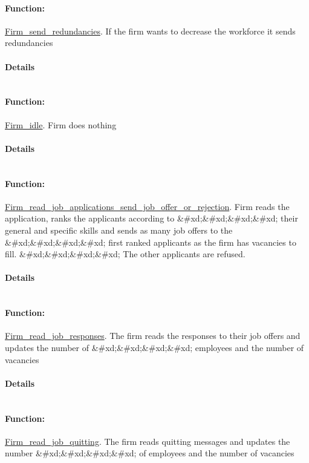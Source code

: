\documentclass[a4paper,11pt]{article}
\begin{document}
\paragraph{Function:}\url{Firm_send_redundancies}.
If the firm wants to decrease the workforce it sends redundancies
\paragraph{Details}
\begin{verbatim}
\end{verbatim}
\paragraph{Function:}\url{Firm_idle}.
Firm does nothing
\paragraph{Details}
\begin{verbatim}
\end{verbatim}
\paragraph{Function:}\url{Firm_read_job_applications_send_job_offer_or_rejection}.
Firm reads the application, ranks the applicants according to \&\#xd;\&\#xd;\&\#xd;\&\#xd;
their general and specific skills and sends as many job offers to the \&\#xd;\&\#xd;\&\#xd;\&\#xd;
first ranked applicants as the firm has vacancies to fill. \&\#xd;\&\#xd;\&\#xd;\&\#xd;
The other applicants are refused.
\paragraph{Details}
\begin{verbatim}
\end{verbatim}
\paragraph{Function:}\url{Firm_read_job_responses}.
The firm reads the responses to their job offers and updates the number of \&\#xd;\&\#xd;\&\#xd;\&\#xd;
employees and the number of vacancies
\paragraph{Details}
\begin{verbatim}
\end{verbatim}
\paragraph{Function:}\url{Firm_read_job_quitting}.
The firm reads quitting messages and updates the number \&\#xd;\&\#xd;\&\#xd;\&\#xd;
of employees and the number of vacancies
\end{document}
